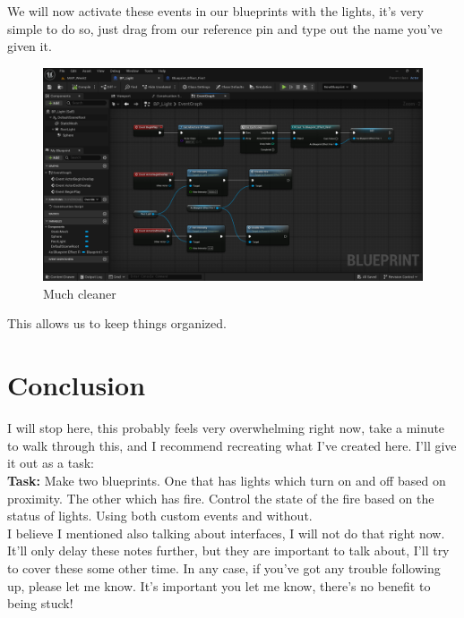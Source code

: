 \documentclass[]{article}
\begin{document}
	We will now activate these events in our blueprints with the lights, it's very simple to do so, just drag from our reference pin and type out the name you've given it.
	
	\begin{figure}[h]
		\centering
		\includegraphics[width=0.8\linewidth]{day4images/screenshot022}
		\caption{Much cleaner}
		\label{fig:screenshot022}
	\end{figure}
	
	This allows us to keep things organized.
	
	\section{Conclusion}
	I will stop here, this probably feels very overwhelming right now, take a minute to walk through this, and I recommend recreating what I've created here. I'll give it out as a task:
	\\[10pt]
	\textbf{Task:} Make two blueprints. One that has lights which turn on and off based on proximity. The other which has fire. Control the state of the fire based on the status of lights. Using both custom events and without.
	\\[10pt]
	I believe I mentioned also talking about interfaces, I will not do that right now. It'll only delay these notes further, but they are important to talk about, I'll try to cover these some other time.
	In any case, if you've got any trouble following up, please let me know. It's important you let me know, there's no benefit to being stuck!
	
	
	
	
	
	
	
	
	
\end{document}
